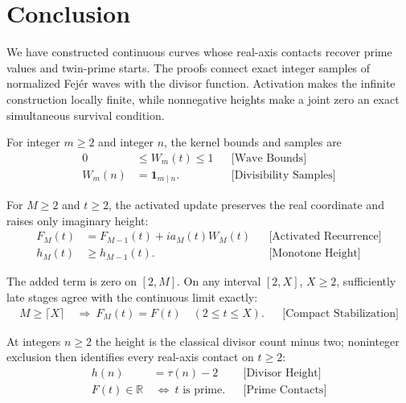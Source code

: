 \section{Conclusion}
We have constructed continuous curves whose real-axis contacts recover prime
values and twin-prime starts. The proofs connect exact integer samples of
normalized Fejér waves with the divisor function. Activation makes the
infinite construction locally finite, while nonnegative heights make a joint
zero an exact simultaneous survival condition.

For integer $m\ge2$ and integer $n$, the kernel bounds and samples are
\begin{equation*}
\begin{aligned}
0&\le W_m(t)\le1
&&\text{[Wave Bounds]}\\
W_m(n)&=\mathbf 1_{m\mid n}.
&&\text{[Divisibility Samples]}
\end{aligned}
\end{equation*}

For $M\ge2$ and $t\ge2$, the activated update preserves the real coordinate
and raises only imaginary height:
\begin{equation*}
\begin{aligned}
F_M(t)&=F_{M-1}(t)+i a_M(t)W_M(t)
&&\text{[Activated Recurrence]}\\
h_M(t)&\ge h_{M-1}(t).
&&\text{[Monotone Height]}
\end{aligned}
\end{equation*}

The added term is zero on $[2,M]$. On any interval $[2,X]$, $X\ge2$,
sufficiently late stages agree with the continuous limit exactly:
\begin{equation*}
\begin{aligned}
M\ge\lceil X\rceil&\ \Longrightarrow\ F_M(t)=F(t)\quad(2\le t\le X).
&&\text{[Compact Stabilization]}
\end{aligned}
\end{equation*}

At integers $n\ge2$ the height is the classical divisor count minus two;
noninteger exclusion then identifies every real-axis contact on $t\ge2$:
\begin{equation*}
\begin{aligned}
h(n)&=\tau(n)-2
&&\text{[Divisor Height]}\\
F(t)\in\mathbb R&\ \Longleftrightarrow\ t\text{ is prime}.
&&\text{[Prime Contacts]}
\end{aligned}
\end{equation*}

